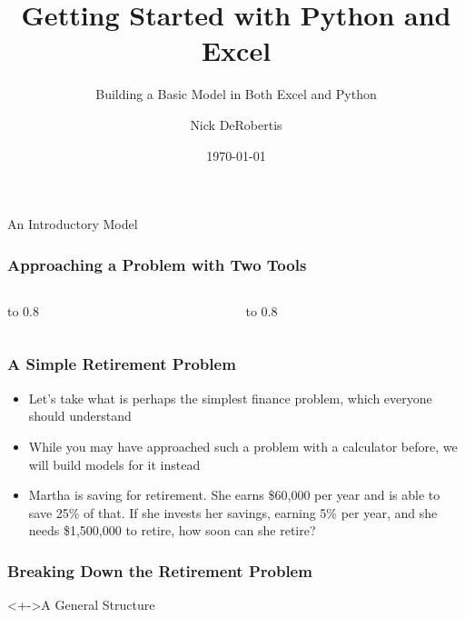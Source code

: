 \documentclass[handout, 11pt]{beamer}
\institute[UF]{\inst{1}
University of Florida\\
Department of Finance, Insurance, and Real Estate}
\begin{document}
\title[Getting Started]{Getting Started with Python and Excel}
\subtitle{Building a Basic Model in Both Excel and Python}
\author[DeRobertis]{Nick DeRobertis}
\date{\today}
\begin{frame}
\titlepage
\label{title-frame}
\end{frame}
\begin{section}{An Introductory Model}
\begin{frame}
\frametitle{Approaching a Problem with Two Tools}
\begin{columns}
\begin{column}{0.5\textwidth}
\vbox to 0.8
\end{column}
\begin{column}{0.5\textwidth}
\vbox to 0.8
\end{column}
\end{columns}
\end{frame}
\begin{frame}
\frametitle{A Simple Retirement Problem}
\begin{itemize}
\item Let's take what is perhaps the simplest finance problem, which everyone should understand
\vfill
\item While you may have approached such a problem with a calculator before, we will build models for it instead
\vfill
\item Martha is saving for retirement. She earns \$60,000 per year and is able to save 25\% of that. If she invests her savings, earning 5\% per year, and she needs \$1,500,000 to retire, how soon can she retire?
\end{itemize}
\end{frame}
\begin{frame}
\frametitle{Breaking Down the Retirement Problem}
\vspace{-0.25cm}
\begin{block}<+->{A General Structure}

\end{block}
\end{frame}
\end{section}
\end{document}
